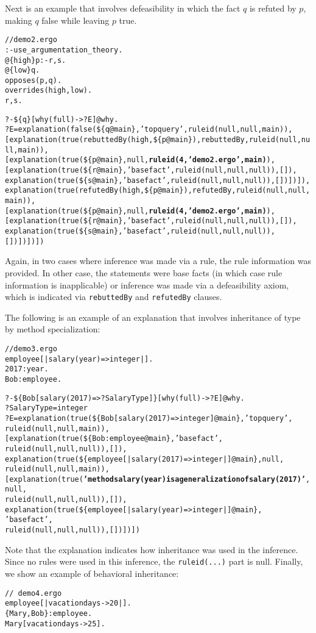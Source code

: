 \begin{itemize}
Next is an example that involves defeasibility in which the fact $q$ is
refuted by $p$, making $q$ false while leaving $p$ true.
{\small
\begin{alltt}
// demo2.ergo
:- use_argumentation_theory.
@\{high\} p :- r,s.
@\{low\}  q.
\bs{}opposes(p,q).
\bs{}overrides(high,low).
r,s.

?- \$\{q\}[why(full)->?E]@\bs{}why.
?E=explanation(false(\$\{q@main\},'top query',ruleid(null,null,main)),
     [explanation(true(rebuttedBy(high,\$\{p@main\}),rebuttedBy,ruleid(null,null,main)),
        [explanation(true(\$\{p@main\},null,\textbf{ruleid(4,'demo2.ergo',main)}),
          [explanation(true(\$\{r@main\},'base fact',ruleid(null,null,null)),[]),
           explanation(true(\$\{s@main\},'base fact',ruleid(null,null,null)),[])])]),
      explanation(true(refutedBy(high,\$\{p@main\}),refutedBy,ruleid(null,null,main)),
        [explanation(true(\$\{p@main\},null,\textbf{ruleid(4,'demo2.ergo',main)}),
           [explanation(true(\$\{r@main\},'base fact',ruleid(null,null,null)),[]),
            explanation(true(\$\{s@main\},'base fact',ruleid(null,null,null)),[])])])])
\end{alltt}
  }
Again, in two cases where inference was made via a rule, the rule
information was provided. In other case, the statements were base facts
(in which case rule information is inapplicable)
or inference was made via a defeasibility axiom, which is indicated via
\texttt{rebuttedBy} and \texttt{refutedBy} clauses.  

The following is an example of an explanation that involves inheritance of
type by method specialization:
{\small
\begin{alltt}
// demo3.ergo
employee[|salary(year)=>\bs{}integer|].
2017:year.
Bob:employee.

?- \$\{Bob[salary(2017)=>?SalaryType]\}[why(full)->?E]@\bs{}why.
?SalaryType = \bs{}integer
?E = explanation(true(\$\{Bob[salary(2017)=>\bs{}integer]@main\},'top query',
                      ruleid(null,null,main)),
       [explanation(true(\$\{Bob:employee@main\},'base fact',
                         ruleid(null,null,null)),[]),
        explanation(true(\$\{employee[|salary(2017)=>\bs{}integer|]@main\},null,
                         ruleid(null,null,main)),
         [explanation(true(\textbf{'method salary(year) is a generalization of salary(2017)'},
                            null,
                            ruleid(null,null,null)),[]),
           explanation(true(\$\{employee[|salary(year)=>\bs{}integer|]@main\},
                            'base fact',
                            ruleid(null,null,null)),[])])])
\end{alltt}
  }
  Note that the explanation indicates how inheritance was used in the
  inference. Since no rules were used in this inference, the
  \texttt{ruleid(...)} part is null.
Finally, we show an example of behavioral inheritance:
{\small
\begin{verbatim}
// demo4.ergo
employee[|vacationdays->20|].
{Mary,Bob}:employee.
Mary[vacationdays->25].


\end{verbatim}}
\end{itemize}
